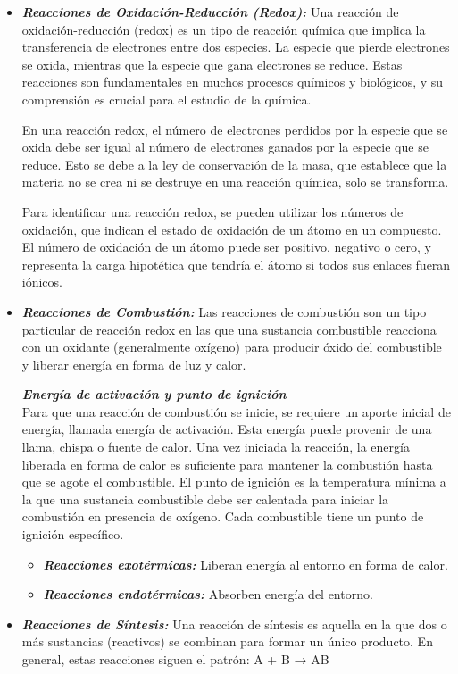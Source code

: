 \begin{itemize}
    \item \textit{\textbf{Reacciones de Oxidación-Reducción (Redox): }}
    Una reacción de oxidación-reducción (redox) es un tipo de reacción química que implica la transferencia de electrones entre dos especies. La especie que pierde electrones se oxida, mientras que la especie que gana electrones se reduce. Estas reacciones son fundamentales en muchos procesos químicos y biológicos, y su comprensión es crucial para el estudio de la química. 

    En una reacción redox, el número de electrones perdidos por la especie que se oxida debe ser igual al número de electrones ganados por la especie que se reduce. Esto se debe a la ley de conservación de la masa, que establece que la materia no se crea ni se destruye en una reacción química, solo se transforma. 
    
    Para identificar una reacción redox, se pueden utilizar los números de oxidación, que indican el estado de oxidación de un átomo en un compuesto. El número de oxidación de un átomo puede ser positivo, negativo o cero, y representa la carga hipotética que tendría el átomo si todos sus enlaces fueran iónicos. 
    \item \textit{\textbf{Reacciones de Combustión: }}
    Las reacciones de combustión son un tipo particular de reacción redox en las que una sustancia combustible reacciona con un oxidante (generalmente oxígeno) para producir óxido del combustible y liberar energía en forma de luz y calor. 
    
    \textit{\textbf{Energía de activación y punto de ignición }}\\
    Para que una reacción de combustión se inicie, se requiere un aporte inicial de energía, llamada energía de activación. Esta energía puede provenir de una llama, chispa o fuente de calor. Una vez iniciada la reacción, la energía liberada en forma de calor es suficiente para mantener la combustión hasta que se agote el combustible. 
    El punto de ignición es la temperatura mínima a la que una sustancia combustible debe ser calentada para iniciar la combustión en presencia de oxígeno. Cada combustible tiene un punto de ignición específico.  
    \begin{itemize}
        \item \textit{\textbf{Reacciones exotérmicas:}} Liberan energía al entorno en forma de calor.
        \item \textit{\textbf{Reacciones endotérmicas:}} Absorben energía del entorno.
    \end{itemize}
    \item \textit{\textbf{Reacciones de Síntesis: }}
    Una reacción de síntesis es aquella en la que dos o más sustancias (reactivos) se combinan para formar un único producto. En general, estas reacciones siguen el patrón: A + B → AB
\end{itemize}

